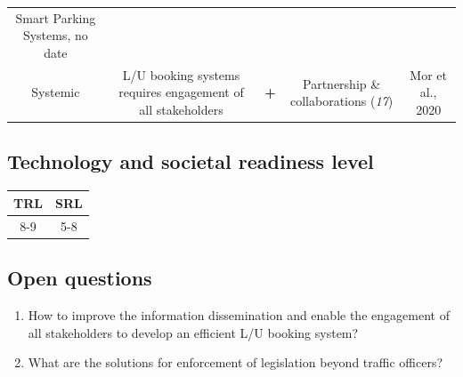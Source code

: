 \documentclass[
]{book}
\providecommand{\tightlist}{%
  \setlength{\itemsep}{0pt}\setlength{\parskip}{0pt}}
\begin{document}
\begin{longtable}[]{@{}ccccc@{}}
\begin{minipage}[t]{0.17\columnwidth}
Smart Parking Systems, no date\strut
\end{minipage}\tabularnewline
\begin{minipage}[t]{0.17\columnwidth}\centering
Systemic\strut
\end{minipage} & \begin{minipage}[t]{0.16\columnwidth}\centering
L/U booking systems requires engagement of all stakeholders\strut
\end{minipage} & \begin{minipage}[t]{0.17\columnwidth}\centering
\textbf{+}\strut
\end{minipage} & \begin{minipage}[t]{0.17\columnwidth}\centering
Partnership \& collaborations (\emph{17})\strut
\end{minipage} & \begin{minipage}[t]{0.17\columnwidth}\centering
Mor et al., 2020\strut
\end{minipage}\tabularnewline
\bottomrule
\end{longtable}

\hypertarget{technology-and-societal-readiness-level-24}{%
\subsection*{Technology and societal readiness level}\label{technology-and-societal-readiness-level-24}}

\begin{longtable}[]{@{}cc@{}}
\toprule
TRL & SRL\tabularnewline
\midrule
\endhead
8-9 & 5-8\tabularnewline
\bottomrule
\end{longtable}

\hypertarget{open-questions-24}{%
\subsection*{Open questions}\label{open-questions-24}}

\begin{enumerate}
\def\labelenumi{\arabic{enumi}.}
\tightlist
\item
  How to improve the information dissemination and enable the engagement of all stakeholders to develop an efficient L/U booking system?
\item
  What are the solutions for enforcement of legislation beyond traffic officers?
\end{enumerate}
\end{document}
